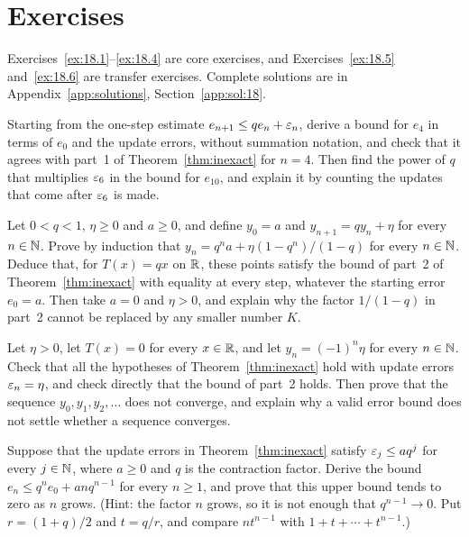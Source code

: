 \section*{Exercises}
Exercises~\ref{ex:18.1}--\ref{ex:18.4} are core exercises, and Exercises~\ref{ex:18.5} and~\ref{ex:18.6} are transfer exercises. Complete solutions are in Appendix~\ref{app:solutions}, Section~\ref{app:sol:18}.
\begin{exercise}\label{ex:18.1}Starting from the one-step estimate $e_{n+1}\le qe_n+\varepsilon_n$, derive a bound for $e_4$ in terms of $e_0$ and the update errors, without summation notation, and check that it agrees with part~1 of Theorem~\ref{thm:inexact} for $n=4$. Then find the power of $q$ that multiplies $\varepsilon_6$ in the bound for $e_{10}$, and explain it by counting the updates that come after $\varepsilon_6$ is made.\end{exercise}
\begin{exercise}\label{ex:18.2}Let $0<q<1$, $\eta\ge0$ and $a\ge0$, and define $y_0=a$ and $y_{n+1}=qy_n+\eta$ for every $n\in\mathbb N$. Prove by induction that $y_n=q^na+\eta(1-q^n)/(1-q)$ for every $n\in\mathbb N$. Deduce that, for $T(x)=qx$ on $\mathbb R$, these points satisfy the bound of part~2 of Theorem~\ref{thm:inexact} with equality at every step, whatever the starting error $e_0=a$. Then take $a=0$ and $\eta>0$, and explain why the factor $1/(1-q)$ in part~2 cannot be replaced by any smaller number $K$.\end{exercise}
\begin{exercise}\label{ex:18.3}Let $\eta>0$, let $T(x)=0$ for every $x\in\mathbb R$, and let $y_n=(-1)^n\eta$ for every $n\in\mathbb N$. Check that all the hypotheses of Theorem~\ref{thm:inexact} hold with update errors $\varepsilon_n=\eta$, and check directly that the bound of part~2 holds. Then prove that the sequence $y_0,y_1,y_2,\ldots$ does not converge, and explain why a valid error bound does not settle whether a sequence converges.\end{exercise}
\begin{exercise}\label{ex:18.4}Suppose that the update errors in Theorem~\ref{thm:inexact} satisfy $\varepsilon_j\le aq^j$ for every $j\in\mathbb N$, where $a\ge0$ and $q$ is the contraction factor. Derive the bound $e_n\le q^n e_0+anq^{n-1}$ for every $n\ge1$, and prove that this upper bound tends to zero as $n$ grows. (Hint: the factor $n$ grows, so it is not enough that $q^{n-1}\to0$. Put $r=(1+q)/2$ and $t=q/r$, and compare $nt^{n-1}$ with $1+t+\cdots+t^{n-1}$.)\end{exercise}
